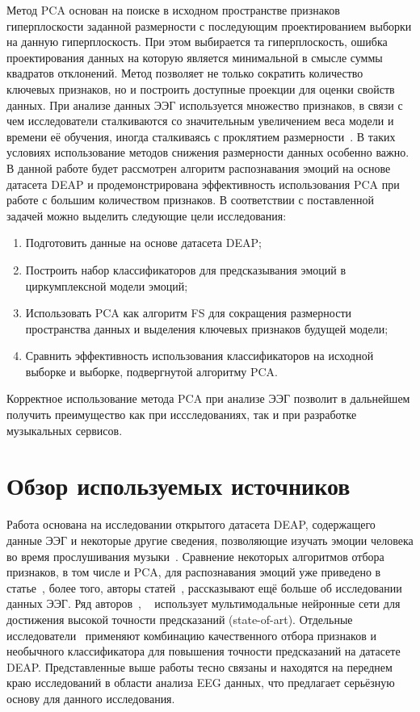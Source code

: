 \documentclass{article}
\begin{document}
Метод PCA основан на поиске в исходном пространстве признаков гиперплоскости заданной размерности с последующим проектированием выборки на данную гиперплоскость. При этом выбирается та гиперплоскость, ошибка проектирования данных на которую является минимальной в смысле суммы квадратов отклонений. Метод позволяет не только сократить количество ключевых признаков, но и построить доступные проекции для оценки свойств данных.
При анализе данных ЭЭГ используется множество признаков, в связи с чем исследователи сталкиваются со значительным увеличением веса модели и времени её обучения, иногда сталкиваясь с проклятием размерности~\cite{Powell}. В таких условиях использование методов снижения размерности данных особенно важно. В данной работе будет рассмотрен алгоритм распознавания эмоций на основе датасета DEAP и продемонстрирована эффективность использования PCA при работе с большим количеством признаков. В соответствии с поставленной задачей можно выделить следующие цели исследования:
\begin{enumerate}
\item Подготовить данные на основе датасета DEAP;
\item Построить набор классификаторов для предсказывания эмоций в циркумплексной модели эмоций;
\item Использовать PCA как алгоритм FS для сокращения размерности пространства данных и выделения ключевых признаков будущей модели;
\item Сравнить эффективность использования классификаторов на исходной выборке и выборке, подвергнутой алгоритму PCA.
\end{enumerate}

Корректное использование метода PCA при анализе ЭЭГ позволит в дальнейшем получить преимущество как при иссследованиях, так и при разработке музыкальных сервисов.

\section{Обзор используемых источников}
Работа основана на исследовании открытого датасета DEAP, содержащего данные ЭЭГ и некоторые другие сведения, позволяющие изучать эмоции человека во время прослушивания музыки~\cite{Koelstra}. Сравнение некоторых алгоритмов отбора признаков, в том числе и PCA, для распознавания эмоций уже приведено в статье~\cite{Nawaz}, более того, авторы статей~\cite{Tandle}, \cite{Scherer} рассказывают ещё больше об исследовании данных ЭЭГ. Ряд авторов~\cite{Zhao}, ~\cite{Zheng} использует мультимодальные нейронные сети для достижения высокой точности предсказаний (state-of-art). Отдельные исследователи~\cite{Atkinson} применяют комбинацию качественного отбора признаков и необычного классификатора для повышения точности предсказаний на датасете DEAP. Представленные выше работы тесно связаны и находятся на переднем краю исследований в области анализа EEG данных, что предлагает серьёзную основу для данного исследования.
\end{document}
